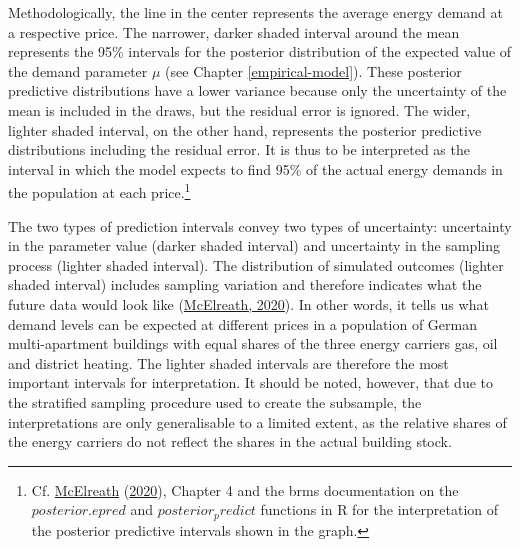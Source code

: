 \documentclass[12pt,twoside]{reedthesis}
\begin{document}
Methodologically, the line in the center represents the average energy demand at a respective price. The narrower, darker shaded interval around the mean represents the 95\% intervals for the posterior distribution of the expected value of the demand parameter \(\mu\) (see Chapter \ref{empirical-model}). These posterior predictive distributions have a lower variance because only the uncertainty of the mean is included in the draws, but the residual error is ignored. The wider, lighter shaded interval, on the other hand, represents the posterior predictive distributions including the residual error. It is thus to be interpreted as the interval in which the model expects to find 95\% of the actual energy demands in the population at each price.\footnote{Cf. \protect\hyperlink{ref-mcelreath20}{McElreath} (\protect\hyperlink{ref-mcelreath20}{2020}), Chapter 4 and the brms documentation on the \(posterior.epred\) and \(posterior_predict\) functions in R for the interpretation of the posterior predictive intervals shown in the graph.}

The two types of prediction intervals convey two types of uncertainty: uncertainty in the parameter value (darker shaded interval) and uncertainty in the sampling process (lighter shaded interval). The distribution of simulated outcomes (lighter shaded interval) includes sampling variation and therefore indicates what the future data would look like (\protect\hyperlink{ref-mcelreath20}{McElreath, 2020}). In other words, it tells us what demand levels can be expected at different prices in a population of German multi-apartment buildings with equal shares of the three energy carriers gas, oil and district heating. The lighter shaded intervals are therefore the most important intervals for interpretation. It should be noted, however, that due to the stratified sampling procedure used to create the subsample, the interpretations are only generalisable to a limited extent, as the relative shares of the energy carriers do not reflect the shares in the actual building stock.
\end{document}
